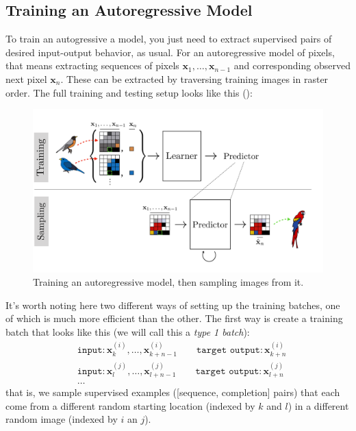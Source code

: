 \subsection{Training an Autoregressive Model}
To train an autogressive a model, you just need to extract supervised pairs of desired input-output behavior, as usual. For an autoregressive model of pixels, that means extracting  sequences of pixels $\mathbf{x}_1, \ldots, \mathbf{x}_{n-1}$ and corresponding observed next pixel $\mathbf{x}_n$. These can be extracted by traversing training images in raster order. The full training and testing setup looks like this (\fig{\ref{fig:generative_models:autoregressive_train_predict}}):
\begin{figure}[h]
    \centerline{
    \includegraphics[width=1.0\linewidth]{./figures/generative_models/autoregressive_train_predict.pdf}
    }
    \caption{Training an autoregressive model, then sampling images from it.}
    \label{fig:generative_models:autoregressive_train_predict}
\end{figure}

It's worth noting here two different ways of setting up the training batches, one of which is much more efficient than the other. The first way is create a training batch that looks like this (we will call this a \textit{type 1 batch}):
\begin{align}
    &\texttt{input}: \mathbf{x}_k^{(i)}, \dots, \mathbf{x}_{k+n-1}^{(i)} \quad\quad \texttt{target output}: \mathbf{x}_{k+n}^{(i)}\\
    &\texttt{input}: \mathbf{x}_l^{(j)}, \dots, \mathbf{x}_{l+n-1}^{(j)} \quad\quad \texttt{target output}: \mathbf{x}_{l+n}^{(j)}\\
    &\ldots\nonumber
\end{align}
that is, we sample supervised examples ([sequence, completion] pairs) that each come from a different random starting location (indexed by $k$ and $l$) in a different random image (indexed by $i$ an $j$). 

